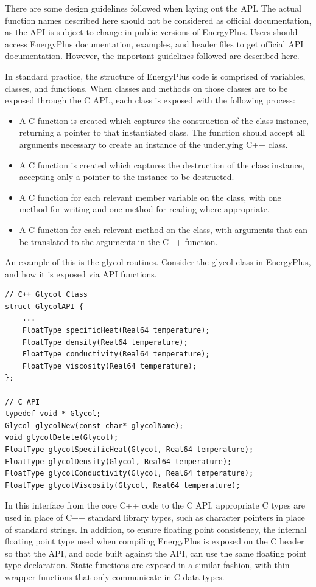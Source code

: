 \documentclass[5p]{elsarticle}
\begin{document}
There are some design guidelines followed when laying out the API.  The actual function names described here should not be considered as official documentation, as the API is subject to change in public versions of EnergyPlus.  Users should access EnergyPlus documentation, examples, and header files to get official API documentation.  However, the important guidelines followed are described here.

In standard practice, the structure of EnergyPlus code is comprised of variables, classes, and functions.  When classes and methods on those classes are to be exposed through the C API,, each class is exposed with the following process:
\begin{itemize}
 \item A C function is created which captures the construction of the class instance, returning a pointer to that instantiated class.  The function should accept all arguments necessary to create an instance of the underlying C++ class.
 \item A C function is created which captures the destruction of the class instance, accepting only a pointer to the instance to be destructed.
 \item A C function for each relevant member variable on the class, with one method for writing and one method for reading where appropriate.  
 \item A C function for each relevant method on the class, with arguments that can be translated to the arguments in the C++ function.
\end{itemize}

An example of this is the glycol routines.  Consider the glycol class in EnergyPlus, and how it is exposed via API functions.

\lstset{language=c}
\begin{lstlisting}
// C++ Glycol Class
struct GlycolAPI {
    ...
    FloatType specificHeat(Real64 temperature);
    FloatType density(Real64 temperature);
    FloatType conductivity(Real64 temperature);
    FloatType viscosity(Real64 temperature);
};

// C API
typedef void * Glycol;
Glycol glycolNew(const char* glycolName);
void glycolDelete(Glycol);
FloatType glycolSpecificHeat(Glycol, Real64 temperature);
FloatType glycolDensity(Glycol, Real64 temperature);
FloatType glycolConductivity(Glycol, Real64 temperature);
FloatType glycolViscosity(Glycol, Real64 temperature);
\end{lstlisting}

In this interface from the core C++ code to the C API, appropriate C types are used in place of C++ standard library types, such as character pointers in place of standard strings.  In addition, to ensure floating point consistency, the internal floating point type used when compiling EnergyPlus is exposed on the C header so that the API, and code built against the API, can use the same floating point type declaration.  Static functions are exposed in a similar fashion, with thin wrapper functions that only communicate in C data types.
\end{document}

